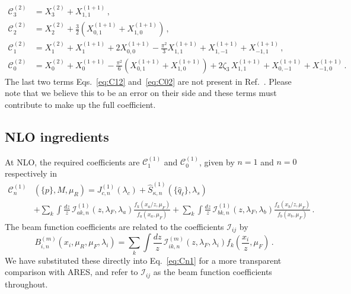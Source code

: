 \begin{subequations}
\label{eq:NNLO-Cn}
\begin{align}
    \mathcal{C}_3^{(2)} &= X_3^{(2)} + X_{1,1}^{(1+1)}\,, 
    \label{eq:C32}\\
    \mathcal{C}_2^{(2)} &= X_2^{(2)} + \frac{3}{2}\!\left(
        X_{0,1}^{(1+1)} + X_{1,0}^{(1+1)}\right)\,,
    \label{eq:C22}\\
    \mathcal{C}_1^{(2)} &= X_1^{(2)} + X_1^{(1+1)} + 2X_{0,0}^{(1+1)}
        - \frac{\pi^2}{3}X_{1,1}^{(1+1)}+X_{1,-1}^{(1+1)}+X_{-1,1}^{(1+1)}\,,
    \label{eq:C12}\\
    \mathcal{C}_0^{(2)} &= X_0^{(2)} + X_0^{(1+1)}
        - \frac{\pi^2}{6}\!\left(X_{0,1}^{(1+1)}+X_{1,0}^{(1+1)}\right)
        + 2\zeta_3\,X_{1,1}^{(1+1)}+X_{0,-1}^{(1+1)}+X_{-1,0}^{(1+1)}\,.
    \label{eq:C02}
\end{align}
\end{subequations}
The last two terms Eqs.~\eqref{eq:C12} and~\eqref{eq:C02} are not present in Ref.~\cite{Gaunt:2015pea}. Please note that
we believe this to be an error on their side and these terms must contribute to make
up the full coefficient.

\subsection{NLO ingredients}
\label{subsec:NLO-ingred}


At NLO, the required coefficients are $\mathcal{C}_1^{(1)}$ and $\mathcal{C}_0^{(1)}$,
given by $n=1$ and $n=0$ respectively in
\begin{equation}
\label{eq:Cn1}
\begin{aligned}
    \mathcal{C}_n^{(1)}&(\{p\},M,\mu_R)=J_{c,n}^{(1)}(\lambda_c)
    +\widehat{S}^{(1)}_{\kappa,n}\!\left(\{\widehat{q}_\ell\},\lambda_s\right)\\
    &+\sum_{k}\int\frac{dz}{z}\,\mathcal{I}_{ak,n}^{(1)}(z,\lambda_F,\lambda_a)
    \frac{f_k(x_a/z,\mu_F)}{f_a(x_a,\mu_F)}
    +\sum_{k}\int\frac{dz}{z}\,\mathcal{I}_{bk,n}^{(1)}(z,\lambda_F,\lambda_b)
    \frac{f_k(x_b/z,\mu_F)}{f_b(x_b,\mu_F)}\,.
\end{aligned}
\end{equation}
The beam function coefficients are related to the
coefficients $\mathcal{I}_{ij}$ by
\begin{equation}
  B_{i,n}^{(m)}(x_i,\mu_R,\mu_F,\lambda_i) =
  \sum_k\int\frac{dz}{z}\,\mathcal{I}_{ik,n}^{(m)}\!\left(z,\lambda_F,\lambda_i\right)
  f_k\!\left(\frac{x_i}{z},\mu_F\right)\,.
\end{equation}
We have substituted these directly into Eq.~\eqref{eq:Cn1} for a
more transparent comparison with \textsc{ARES}, and refer to
$\mathcal{I}_{ij}$ as the beam function coefficients throughout.

